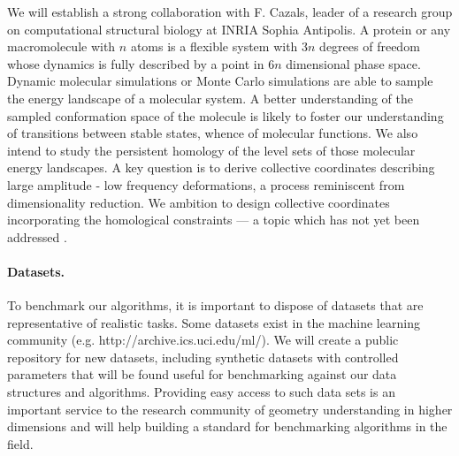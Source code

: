We will establish a strong collaboration with F. Cazals, leader of a
research group on computational structural biology at INRIA Sophia
Antipolis. A protein or any macromolecule with $n$ atoms is a flexible
system with $3n$ degrees of freedom whose dynamics is fully described
by a point in $6n$ dimensional phase space. Dynamic molecular
simulations or Monte Carlo simulations are able to sample the energy
landscape of a molecular system. A better understanding of the
sampled conformation space of the molecule is likely to
foster our understanding of transitions between stable states,
whence of molecular functions.
We also intend to study the persistent homology
of the level sets of those molecular energy landscapes. A key question
 is to derive collective coordinates describing large amplitude -
low frequency deformations, a process reminiscent from dimensionality
reduction. We ambition to design collective coordinates incorporating
the homological constraints --- a topic which has not yet been
addressed \cite{djw-el-2003}. 



\paragraph{Datasets.}
To benchmark our algorithms, it is important to dispose of datasets
that are representative of realistic tasks. Some datasets exist in the
machine learning community (e.g. http://archive.ics.uci.edu/ml/). We
will create a public repository for new datasets, including synthetic
datasets with controlled parameters that will be found useful for
benchmarking against our data structures and algorithms. Providing easy
access to such data sets is an important service to the research
community of geometry understanding in higher dimensions and will help
building a standard for benchmarking algorithms in the field.



